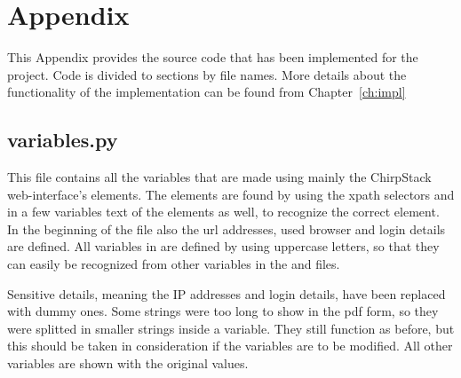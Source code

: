 
\chapter{Appendix}\label{appx:sourcecode}

This Appendix provides the source code that has been implemented for the project.
Code is divided to sections by file names.
More details about the functionality of the implementation can be found from Chapter~\ref{ch:impl}

\section{variables.py}

This file contains all the variables that are made using mainly the ChirpStack web-interface's elements.
The elements are found by using the xpath selectors and in a few variables text of the elements as well, to recognize the correct element.
In the beginning of the file also the url addresses, used browser and login details are defined.
All variables in  are defined by using uppercase letters, so that they can easily be recognized from other variables in the  and  files.

Sensitive details, meaning the IP addresses and login details, have been replaced with dummy ones.
Some strings were too long to show in the pdf form, so they were splitted in smaller strings inside a variable.
They still function as before, but this should be taken in consideration if the variables are to be modified.
All other variables are shown with the original values.

